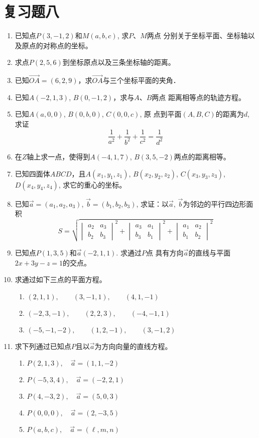 \section*{复习题八}
\begin{enumerate}
\item 已知点$P(3,-1,2)$和$M(a,b,c)$, 求$P$、$M$两点
分别关于坐标平面、坐标轴以及原点的对称点的坐标。
\item 求点$P(2,5,6)$到坐标原点以及三条坐标轴的距离。
\item 已知$\Vec{OA}=(6,2,9)$，求$\Vec{OA}$与三个坐标平面的夹角．
\item 已知$A(-2,1,3)$, $B(0,-1,2)$，求与$A$、$B$两点
距离相等点的轨迹方程。
\item 已知$A(a,0,0)$, $B(0,b,0)$, $C(0,0,c)$, 原
点到平面$(A,B,C)$的距离为$d$, 求证
\[\frac{1}{a^2}+\frac{1}{b^2}+\frac{1}{c^2}=\frac{1}{d^2}\]
\item 在$Z$轴上求一点，使得到$A(-4,1,7)$, $B(3,5,-2)$两点的距离相等。
\item 已知四面体$ABCD$，且$A(x_1,y_1,z_1)$, $B(x_2,
y_2,z_2)$, $C(x_3,y_3, z_3)$, $D(x_4, y_4,z_4)$, 
求它的重心的坐标。
\item 已知$\vec{a}=(a_1,a_2,a_3)$, $\vec{b}=(b_1,b_2,b_3)$, 求证：以$\vec{a}$, $\vec{b}$为邻边的平行四边形面积
\[S=\sqrt{\begin{vmatrix}
    a_2&a_3\\b_2&b_3
\end{vmatrix}^2+\begin{vmatrix}
    a_3&a_1\\b_3&b_1
\end{vmatrix}^2+\begin{vmatrix}
    a_1&a_2\\b_1&b_2
\end{vmatrix}^2}\]

\item 已知点$P(1,3,5)$和$\vec{a}(-2,1,1)$. 求通过$P$点
具有方向$\vec{a}$的直线与平面$2x+3y-z=1$的交点。

\item 求通过如下三点的平面方程。
\begin{enumerate}
    \item $(2,1,1),\qquad (3,-1,1),\qquad (4,1,-1)$
    \item $(-2,3,-1),\qquad (2,2,3),\qquad (-4,-1,1)$
    \item $(-5,-1,-2),\qquad (1,2,-1),\qquad (3,-1,2)$
\end{enumerate}

\item 求下列通过已知点$P$且以$\vec{a}$为方向向量的直线方程。
\begin{multicols}{2}
    \begin{enumerate}
    \item $P(2,1,3),\quad \vec{a}=(1,1,-2)$
    \item $P(-5,3,4),\quad \vec{a}=(-2,2,1)$
    \item $P(4,-3,2),\quad \vec{a}=(5,0,3)$
    \item $P(0,0,0),\quad \vec{a}=(2,-3,5)$
    \item $P(a,b,c),\quad \vec{a}=(\ell,m,n)$
\end{enumerate}
\end{multicols}

\end{enumerate}

